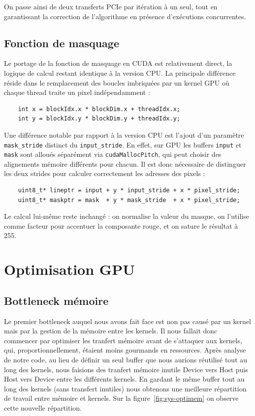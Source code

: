 \documentclass[12pt]{article}
\begin{document}
    On passe ainsi de deux transferts PCIe par itération à un seul, tout en garantissant la correction de l'algorithme en présence d'exécutions concurrentes.


    \subsection{Fonction de masquage}
    Le portage de la fonction de masquage en CUDA est relativement direct, la logique de calcul restant identique à la version CPU. La principale différence réside dans le remplacement des boucles imbriquées par un kernel GPU où chaque thread traite un pixel indépendamment :

    \begin{verbatim}
    int x = blockIdx.x * blockDim.x + threadIdx.x;
    int y = blockIdx.y * blockDim.y + threadIdx.y;
    \end{verbatim}

    Une différence notable par rapport à la version CPU est l'ajout d'un paramètre \verb|mask_stride| distinct du \verb|input_stride|. En effet, sur GPU les buffers \verb|input| et \verb|mask| sont alloués séparément via \verb|cudaMallocPitch|, qui peut choisir des alignements mémoire différents pour chacun. Il est donc nécessaire de distinguer les deux strides pour calculer correctement les adresses des pixels :

    \begin{verbatim}
    uint8_t* lineptr = input + y * input_stride + x * pixel_stride;
    uint8_t* maskptr = mask  + y * mask_stride  + x * pixel_stride;
    \end{verbatim}

    Le calcul lui-même reste inchangé : on normalise la valeur du masque, on l'utilise comme facteur pour accentuer la composante rouge, et on sature le résultat à 255.


    \bigskip
    \section{Optimisation GPU}
    \subsection{Bottleneck mémoire}
    Le premier bottleneck auquel nous avons fait face est non pas causé par un kernel mais par la gestion de la mémoire entre les kernels. Il nous fallait donc commencer par optimiser les tranfert mémoire avant de s'attaquer aux kernels, qui, proportionnellement, étaient moins gourmands en ressources. Après analyse de notre code, au lieu de définir un seul buffer que nous aurions réutilisé tout au long des kernels, nous faisions des tranfert mémoire inutile Device vers Host puis Host vers Device entre les différents kernels.
    \newline
    En gardant le même buffer tout au long des kernels (sans transfert inutiles) nous obtenons une meilleure répartition de travail entre mémoire et kernels. \newline
    Sur la figure~\ref{fig:sys-optimem} on observe cette nouvelle répartition.
\end{document}
